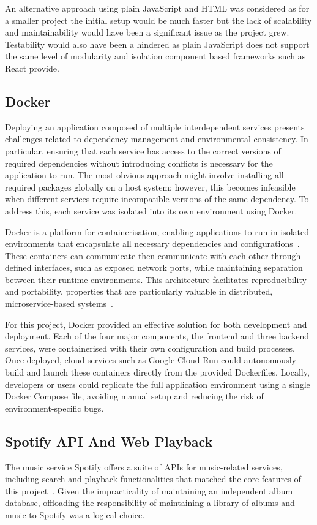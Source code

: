 An alternative approach using plain JavaScript and HTML was considered as for a smaller project the initial setup would be much faster but the lack of scalability and maintainability would have been a significant issue as the project grew. Testability would also have been a hindered as plain JavaScript does not support the same level of modularity and isolation component based frameworks such as React provide.

\subsection{Docker}
Deploying an application composed of multiple interdependent services presents challenges related to dependency management and environmental consistency. In particular, ensuring that each service has access to the correct versions of required dependencies without introducing conflicts is necessary for the application to run. The most obvious approach might involve installing all required packages globally on a host system; however, this becomes infeasible when different services require incompatible versions of the same dependency. To address this, each service was isolated into its own environment using Docker.

Docker is a platform for containerisation, enabling applications to run in isolated environments that encapsulate all necessary dependencies and configurations~\cite{DockerDocs}. These containers can communicate then communicate with each other through defined interfaces, such as exposed network ports, while maintaining separation between their runtime environments. This architecture facilitates reproducibility and portability, properties that are particularly valuable in distributed, microservice-based systems~\cite{MerkelDocker,AWSDocker}.

For this project, Docker provided an effective solution for both development and deployment. Each of the four major components, the frontend and three backend services, were containerised with their own configuration and build processes. Once deployed, cloud services such as Google Cloud Run could autonomously build and launch these containers directly from the provided Dockerfiles. Locally, developers or users could replicate the full application environment using a single Docker Compose file, avoiding manual setup and reducing the risk of environment-specific bugs.

\subsection{Spotify API And Web Playback}
The music service Spotify offers a suite of APIs for music-related services, including search and playback functionalities that matched the core features of this project~\cite{SpotifyAPI}. Given the impracticality of maintaining an independent album database, offloading the responsibility of maintaining a library of albums and music to Spotify was a logical choice.

